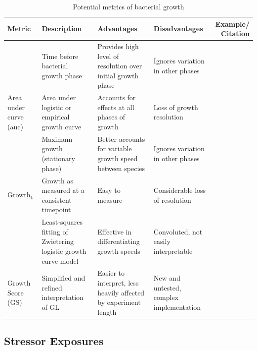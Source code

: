 \documentclass[10pt]{article}
\begin{document}
\begin{table}[ht]
\centering
\scriptsize
\renewcommand{\arraystretch}{1.8}
\begin{tabular}{P M L L N}
\toprule 
\textbf{Metric} & \textbf{Description} & \textbf{Advantages} & \textbf{Disadvantages} & \textbf{Example/ Citation} \\
\midrule
{} & Time before bacterial growth phase & Provides high level of resolution over initial growth phase & Ignores variation in other phases & \cite{Monod1949} \\
{Area under curve (auc)} & Area under logistic or empirical growth curve & Accounts for effects at all phases of growth & Loss of growth resolution & \cite{Firsov2001} \\
 & Maximum growth (stationary phase) & Better accounts for variable growth speed between species & Ignores variation in other phases & \cite{Chapman2018} \\
{Growth\textsubscript{t}} & Growth as measured at a consistent timepoint & Easy to measure & Considerable loss of resolution & \cite{Hall2014} \\
 & Least-squares fitting of Zwietering logistic growth curve model & Effective in differentiating growth speeds &  Convoluted, not easily interpretable & \cite{Cuevas2017,Cuevas2018}\\
{Growth Score (GS)} & Simplified and refined interpretation of GL & Easier to interpret, less heavily affected by experiment length & New and untested, complex implementation & \cite{Cuevas2018}\\
\bottomrule
\end{tabular}
\caption{Potential metrics of bacterial growth}
\label{tab:metrics}
\end{table}

\subsection{Stressor Exposures}
\label{S:2:5}
\end{document}
